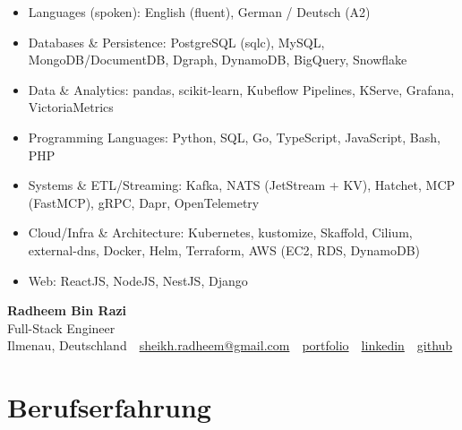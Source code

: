 \documentclass[10pt,a4paper]{resume}
\makeatletter
\newcommand{\Portfolio}{https://radheem.github.io/my-cv}
\newcommand{\PortfolioText}{portfolio}
\newcommand{\GitHub}{https://github.com/radheem}
\newcommand{\LinkedIn}{https://www.linkedin.com/in/radheem-razi}
\newcommand{\Email}{sheikh.radheem@gmail.com}
\makeatother
\begin{document}
\begin{itemize}[leftmargin=1.4em,nosep,topsep=2pt]
  \item Languages (spoken): English (fluent), German / Deutsch (A2)
  \item Databases \& Persistence: PostgreSQL (sqlc), MySQL, MongoDB/DocumentDB, Dgraph, DynamoDB, BigQuery, Snowflake
  \item Data \& Analytics: pandas, scikit-learn, Kubeflow Pipelines, KServe, Grafana, VictoriaMetrics
  \item Programming Languages: Python, SQL, Go, TypeScript, JavaScript, Bash, PHP
  \item Systems \& ETL/Streaming: Kafka, NATS (JetStream + KV), Hatchet, MCP (FastMCP), gRPC, Dapr, OpenTelemetry
  \item Cloud/Infra \& Architecture: Kubernetes, kustomize, Skaffold, Cilium, external-dns, Docker, Helm, Terraform, AWS (EC2, RDS, DynamoDB)
  \item Web: ReactJS, NodeJS, NestJS, Django
\end{itemize}

\clearpage
{}

\begin{center}
  {\huge\bfseries Radheem Bin Razi}\\[3pt]
  {\large Full-Stack Engineer}\\[6pt]
  \small
  Ilmenau, Deutschland \,\textbar\,
  \href{mailto:\Email}{\Email} \,\textbar\,
  \href{\Portfolio}{\PortfolioText} \,\textbar\,
  \href{\LinkedIn}{linkedin} \,\textbar\,
  \href{\GitHub}{github}
\end{center}
\vspace{2pt}

\section{Berufserfahrung}
\end{document}
